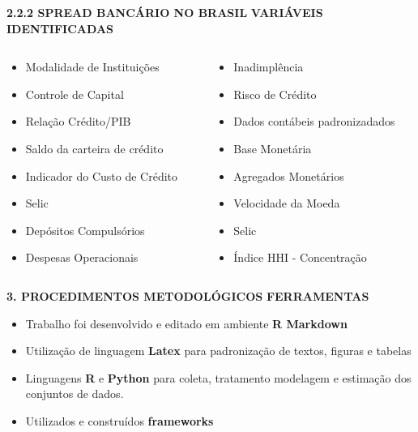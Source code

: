 \documentclass[
  ignorenonframetext,
  aspectratio=169,
  ignorenonframetext]{beamer}
\providecommand{\tightlist}{%
  \setlength{\itemsep}{0pt}\setlength{\parskip}{0pt}}
\begin{document}
\begin{frame}{\textbf{2.2.2 SPREAD BANCÁRIO NO BRASIL}}
\protect\hypertarget{spread-bancuxe1rio-no-brasil-3}{}
\textbf{VARIÁVEIS IDENTIFICADAS}

\begin{columns}[T]
\begin{column}{0.5\textwidth}
\begin{itemize}
\tightlist
\item
  Modalidade de Instituições
\item
  Controle de Capital
\item
  Relação Crédito/PIB
\item
  Saldo da carteira de crédito
\item
  Indicador do Custo de Crédito
\item
  Selic
\item
  Depósitos Compulsórios
\item
  Despesas Operacionais
\end{itemize}
\end{column}

\begin{column}{0.5\textwidth}
\begin{itemize}
\tightlist
\item
  Inadimplência
\item
  Risco de Crédito
\item
  Dados contábeis padronizadados
\item
  Base Monetária
\item
  Agregados Monetários
\item
  Velocidade da Moeda
\item
  Selic
\item
  Índice HHI - Concentração
\end{itemize}
\end{column}
\end{columns}
\end{frame}

\begin{frame}{\textbf{3. PROCEDIMENTOS METODOLÓGICOS}}
\protect\hypertarget{procedimentos-metodoluxf3gicos}{}
\textbf{FERRAMENTAS}

\begin{itemize}
\item
  Trabalho foi desenvolvido e editado em ambiente \textbf{R Markdown}
\item
  Utilização de linguagem \textbf{Latex} para padronização de textos,
  figuras e tabelas
\item
  Linguagens \textbf{R} e \textbf{Python} para coleta, tratamento
  modelagem e estimação dos conjuntos de dados.
\item
  Utilizados e construídos \textbf{frameworks}
\end{itemize}
\end{frame}
\end{document}
